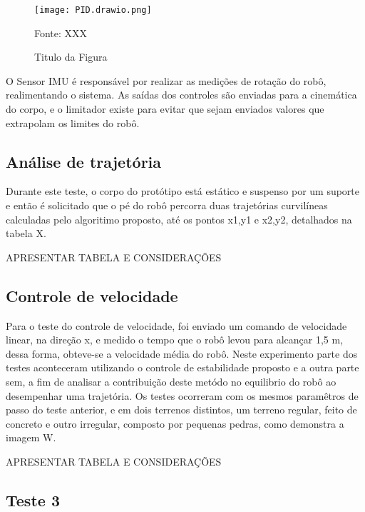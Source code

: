 \documentclass[../main.tex]{subfiles}
\begin{document}
  \begin{figure}[h]
    \centering
    \caption{Titulo da Figura}
    \texttt{[image: PID.drawio.png]}
    
    Fonte: XXX
    \label{fig:pid}
  \end{figure}

  O Sensor IMU é responsável por realizar as medições de rotação do robô, realimentando o sistema. As saídas dos controles são enviadas para a cinemática do corpo, e o limitador existe para evitar que sejam enviados valores que extrapolam os limites do robô.

  \subsection{Análise de trajetória}
  Durante este teste, o corpo do protótipo está estático e suspenso por um suporte e então é solicitado que o pé do robô percorra duas trajetórias curvilíneas calculadas pelo algoritimo proposto, até os pontos x1,y1 e x2,y2, detalhados na tabela X.

  APRESENTAR TABELA E CONSIDERAÇÕES

  \subsection{Controle de velocidade}

  Para o teste do controle de velocidade, foi enviado um comando de velocidade linear, na direção x, e medido o tempo que o robô levou para alcançar 1,5 m, dessa forma, obteve-se a velocidade média do robô. Neste experimento parte dos testes aconteceram utilizando o controle de estabilidade proposto e a outra parte sem, a fim de analisar a contribuição deste metódo no equilibrio do robô ao desempenhar uma trajetória. Os testes ocorreram com os mesmos paramêtros de passo do teste anterior, e em dois terrenos distintos, um terreno regular, feito de concreto e outro irregular, composto por pequenas pedras, como demonstra a imagem W.

  APRESENTAR TABELA E CONSIDERAÇÕES
  
  \subsection{Teste 3}

    
\end{document}
